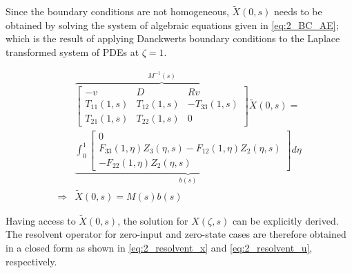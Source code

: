     Since the boundary conditions are not homogeneous, ${\tilde{X}}(0,s)$ needs to be obtained by solving the system of algebraic equations given in \eqref{eq:2_BC_AE}; which is the result of applying Danckwerts boundary conditions to the Laplace transformed system of PDEs at $\zeta = 1$.
    
    \begin{equation} \label{eq:2_BC_AE}
    \begin{aligned}
            &\overbrace{\begin{bmatrix}
                -v & D & Rv\\
                T_{11}(1,s) & T_{12}(1,s) & -T_{33}(1,s)\\
                T_{21}(1,s) & T_{22}(1,s) & 0
            \end{bmatrix}}^{M^{-1}(s)} {\tilde{X}}(0,s) =\\ 
            &\underbrace{\int_0^1 \begin{bmatrix}
                0\\ F_{33}(1, \eta) Z_3(\eta,s) - F_{12}(1, \eta) Z_2(\eta,s)\\ -F_{22}(1, \eta) Z_2(\eta,s)
            \end{bmatrix} d\eta}_{{b}(s)} \\
            \Rightarrow &{\tilde{X}}(0,s) = M(s) {b}(s)
    \end{aligned}
    \end{equation}
    
    Having access to ${\tilde{X}}(0,s)$, the solution for ${X}(\zeta,s)$ can be explicitly derived. The resolvent operator for zero-input and zero-state cases are therefore obtained in a closed form as shown in \eqref{eq:2_resolvent_x} and \eqref{eq:2_resolvent_u}, respectively.
    
